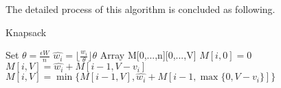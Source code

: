   The detailed process of this algorithm is concluded as following.
  
  \begin{algorithm}[H]
    \caption{Knapsack}
    \begin{small}
      \begin{algorithmic}[1]
        \State Set $\theta = \frac{\epsilon W}{n}$
        \State $\hat{w_i} = \lfloor\frac{w_i}{\theta}\rfloor\theta$
        \EndFor
        \State Array M[0,...,n][0,...,V]
        \State $M[i,0] = 0$
        \EndFor
        \State $M[i,V] = \hat{w_i}+M[i-1,V-v_i]$
        \Else
        \State $M[i,V] = \min\{M[i-1,V], \hat{w_i}+M[i-1,\max\{0,V-v_i\}]\}$
        \EndIf
        \EndFor
        \EndFor
      \end{algorithmic}
    \end{small}
  \end{algorithm}


